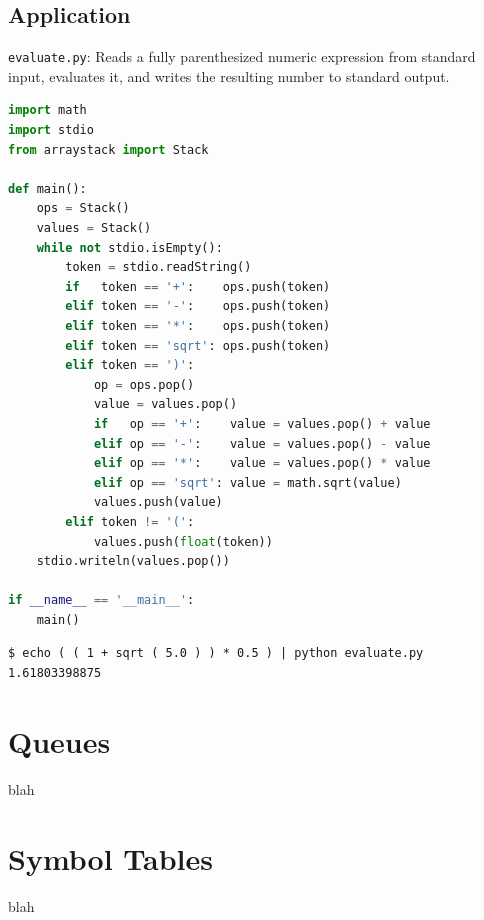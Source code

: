 \documentclass[8pt,a4paper,compress,handout]{beamer}
\begin{document}
\subsection*{Application}
\begin{frame}[fragile]
\begin{framed}
\tiny \lstinline{evaluate.py}: Reads a fully parenthesized numeric expression from standard input, evaluates it, and writes the resulting number to standard output.
\end{framed}

\begin{lstlisting}[language=Python]
import math
import stdio
from arraystack import Stack

def main():
    ops = Stack()
    values = Stack()
    while not stdio.isEmpty():
        token = stdio.readString()
        if   token == '+':    ops.push(token)
        elif token == '-':    ops.push(token)
        elif token == '*':    ops.push(token)
        elif token == 'sqrt': ops.push(token)
        elif token == ')':
            op = ops.pop()
            value = values.pop()
            if   op == '+':    value = values.pop() + value
            elif op == '-':    value = values.pop() - value
            elif op == '*':    value = values.pop() * value
            elif op == 'sqrt': value = math.sqrt(value)
            values.push(value)
        elif token != '(':
            values.push(float(token))
    stdio.writeln(values.pop())

if __name__ == '__main__':
    main()
\end{lstlisting}

\begin{lstlisting}[language={}]
$ echo ( ( 1 + sqrt ( 5.0 ) ) * 0.5 ) | python evaluate.py 
1.61803398875
\end{lstlisting}
\end{frame}

\section{Queues}
\begin{frame}[fragile]
blah
\end{frame}

\section{Symbol Tables}
\begin{frame}[fragile]
blah
\end{frame}
\end{document}
